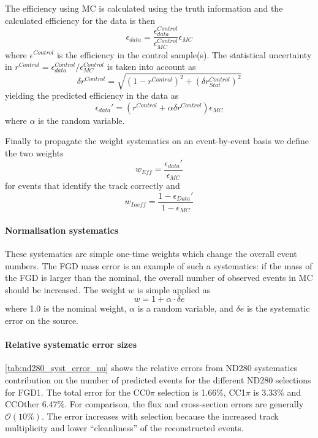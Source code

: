 The efficiency using MC is calculated using the truth information and the calculated efficiency for the data is then
\begin{equation}
\epsilon_{data} = \frac{\epsilon_{data}^{Control}}{\epsilon_{MC}^{Control}} \epsilon_{MC}
\end{equation}
where $\epsilon^{Control}$ is the efficiency in the control sample(s). The statistical uncertainty in $r^{Control} = \epsilon^{Control}_{data}/\epsilon^{Control}_{MC}$ is taken into account as
\begin{equation}
\delta r^{Control} = \sqrt{\left(1-r^{Control}\right)^2 + \left(\delta r^{Control}_{Stat}\right)^2}
\end{equation}
yielding the predicted efficiency in the data as
\begin{equation}
\epsilon_{data}' = \left(r^{Control} + \alpha \delta r^{Control}\right)\epsilon_{MC}
\end{equation}
where $\alpha$ is the random variable.

Finally to propagate the weight systematics on an event-by-event basis we define the two weights
\begin{equation}
w_{Eff} = \frac{\epsilon_{data}'}{\epsilon_{MC}}
\end{equation}
for events that identify the track correctly and
\begin{equation}
w_{Ineff} = \frac{1-\epsilon_{Data}'}{1-\epsilon_{MC}}
\end{equation}

\paragraph{Normalisation systematics}
These systematics are simple one-time weights which change the overall event numbers. The FGD mass error is an example of such a systematics: if the mass of the FGD is larger than the nominal, the overall number of observed events in MC should be increased. The weight $w$ is simple applied as
\begin{equation}
w = 1+\alpha \cdot \delta e
\end{equation}
where 1.0 is the nominal weight, $\alpha$ is a random variable, and $\delta e$ is the systematic error on the source.

\paragraph{Relative systematic error sizes}
\autoref{tab:nd280_syst_error_nu} shows the relative errors from ND280 systematics contribution on the number of predicted events for the different ND280 \numu selections for FGD1. The total error for the CC0$\pi$ selection is 1.66\%, CC1$\pi$ is 3.33\% and CCOther 6.47\%. For comparison, the flux and cross-section errors are generally $\mathcal{O}\left(10\%\right)$. The error increases with selection because the increased track multiplicity and lower ``cleanliness'' of the reconstructed events. 

